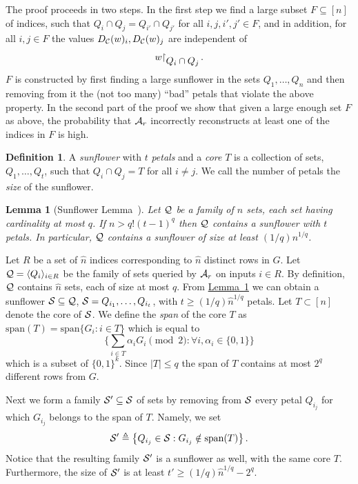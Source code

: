 \documentclass[10pt]{article}
\newtheorem{lemma}[theorem]{Lemma}
\theoremstyle{definition}
\newtheorem{definition}[theorem]{Definition}
\numberwithin{equation}{section}
\newcommand{\expref}[2]{\texorpdfstring{\hyperref[#2]{#1~\ref{#2}}}{#1~\ref{#2}}}
\newcommand{\ALG}{{\cal A}}
\newcommand{\SUN}{{\cal S}}
\newcommand{\QQ}{{\cal Q}}
\newcommand{\zo}{{\{0,1\}}}
\newcommand{\DEC}{{D_{\cal C}}}
\newcommand{\nrows}{{\hat n }}
\newcommand{\rst}[1]{\ensuremath{{\mathbin\upharpoonright}%
\raise-.9ex\hbox{$#1$}}}
\begin{document}
The proof proceeds in two steps. In the first step we find a large
subset $F \subseteq [n]$ of indices, such that $Q_i \cap Q_j = Q_{i'}
\cap Q_{j'}$ for all $i,j,i',j' \in F$, and in addition, for all $i,j
\in F$ the values $\DEC(w)_i, \DEC(w)_j$ are independent of
\[
w\rst{Q_i \cap Q_j}\,.
\]
$F$ is constructed by first finding a large sunflower in the sets $Q_1,\ldots,Q_n$ and then removing from it the (not too many) ``bad'' petals that violate the above property. In the second part of the proof we show that given a large enough set $F$ as above, the probability that $\ALG_r$ incorrectly reconstructs at least one of the indices in $F$ is high.

\begin{definition}
A \emph{sunflower} with $t$ \emph{petals} and a \emph{core} $T$ is a collection of sets,
%
$Q_1,\ldots,Q_t$, such that $Q_i \cap Q_j = T$ for all $i \ne j$.
%
%
We call the number of petals the \emph{size} of the sunflower.
\end{definition}

\begin{lemma}[Sunflower Lemma~\cite{sunflower}]\label{lem:sunfl}
Let $\QQ$ be a family of $n$ sets, each set having cardinality at most $q$. If
$n > q!(t - 1)^q$ then $\QQ$ contains a sunflower with $t$ petals. In particular, $\QQ$ contains a sunflower of size at least $({1}/{q}) n^{1/q}$.
\end{lemma}

Let $R$ be a set of $\nrows$ indices corresponding to $\nrows$ distinct rows in $G$. Let $\QQ = \langle Q_i \rangle_{i \in R}$ be the family of sets queried by $\ALG_r$ on inputs $i \in R$. By definition, $\QQ$ contains $\nrows$ sets, each of size at most $q$. {}From \expref{Lemma}{lem:sunfl} we can obtain a sunflower $\SUN \subseteq \QQ$, $\SUN = Q_{i_1},\ldots,Q_{i_t}$, with $t \geq ({1}/{q}) \nrows^{1/q}$ petals. Let $T \subset [n]$ denote the core of $\SUN$.
We define the \emph{span} of the core $T$ as
$\mbox{span}(T) = \mbox{span}\{G_i : i\in T\}$ which is equal to  $$\Big\{ \sum_{i\in T} \alpha_i G_i \pmod{2}: \forall i, \alpha_i \in \zo \Big\}$$
which is a subset of $\zo^k$.
Since $|T| \leq q$ the span of $T$ contains at most $2^q$ different rows from $G$.

Next we form a family $\SUN' \subseteq \SUN$ of sets by removing from $\SUN$ every petal $Q_{i_j}$ for which $G_{i_j}$ belongs to the span of $T$.
Namely, we set
\[
\SUN' \triangleq \bigl\{Q_{i_j} \in \SUN : G_{i_j} \notin \mbox{span}(T)
\bigr\}\,.
\]
Notice that the
resulting family $\SUN'$ is a sunflower as well, with the same core $T$. Furthermore, the size of $\SUN'$ is
at least $t' \geq ({1}/{q}) \nrows^{1/q} - 2^q$.
\end{document}
